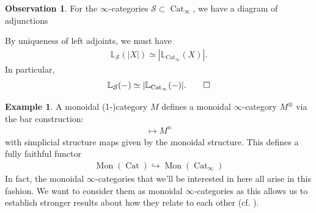 \documentclass[12pt, reqno]{amsart}
\theoremstyle{plain}
\theoremstyle{definition}
\newtheorem{example}[theorem]{Example}
\newtheorem{observation}[theorem]{Observation}
\begin{document}
\begin{observation}
For the $\infty$-categories $\mathcal{S}\subset \operatorname{Cat}_\infty$, we have a diagram of adjunctions
\begin{center}
\end{center}

By uniqueness of left adjoints, we must have
\begin{align*}
\mathbb{L}_\mathcal{S}(|X|)\simeq |\mathbb{L}_{\operatorname{Cat}_\infty}(X)|.
\end{align*}
In particular,
\begin{equation*}
\mathbb{L}_\mathcal{S}(-)\simeq |\mathbb{L}_{\operatorname{Cat}_\infty}(-)|.\qedhere
\end{equation*}
\end{observation}

\begin{example}
A monoidal (1-)category $M$ defines a monoidal $\infty$-category $M^\otimes$ via the bar construction:
\begin{align*}
[n]\mapsto M^n
\end{align*}
with simplicial structure maps given by the monoidal structure. This defines a fully faithful functor
\begin{align*}
\operatorname{Mon}(\operatorname{Cat})\hookrightarrow \operatorname{Mon}(\operatorname{Cat}_\infty)
\end{align*}
In fact, the monoidal $\infty$-categories that we'll be interested in here all arise in this fashion. We want to consider them as monoidal $\infty$-categories as this allows us to establish stronger results about how they relate to each other (cf. ).
\end{example}
\end{document}
